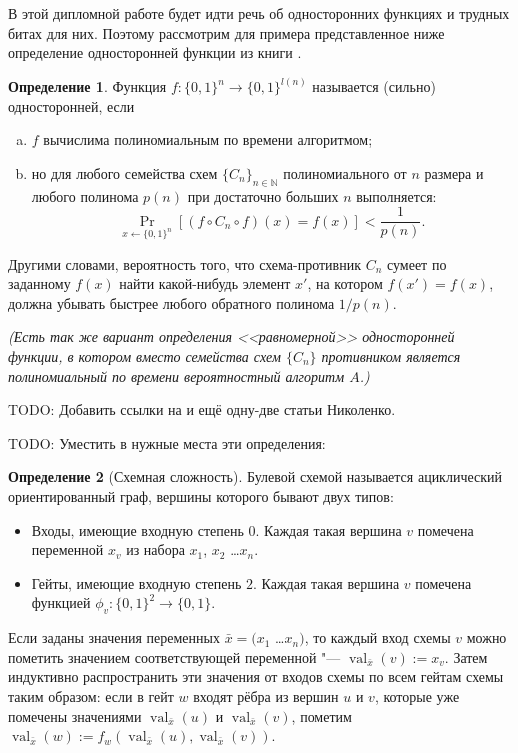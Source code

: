 \documentclass[oneside, a4paper]{article}
\theoremstyle{definition}
\newtheorem{definition}{Определение}
\theoremstyle{remark}
\DeclareMathOperator*{\val}{val}
\begin{document}
В этой дипломной работе будет идти речь об односторонних функциях и трудных
битах для них. Поэтому рассмотрим для примера представленное ниже определение
односторонней функции из книги \cite[гл. 2]{goldreich}.

\begin{definition}
Функция $f : \{0, 1\}^n \to \{0, 1\}^{l(n)}$ называется (сильно) односторонней,
если
\begin{enumerate}[(a)]
\item $f$ вычислима полиномиальным по времени алгоритмом;
\item но для любого семейства схем $\{ C_n \}_{n \in \mathbb N}$ полиномиального
от $n$ размера и любого полинома $p(n)$ при достаточно больших $n$ выполняется:
\[
\Pr_{x \gets \{0, 1\}^n}[(f \circ C_n \circ f)(x) = f(x)] < \frac 1 {p(n)}.
\]
\end{enumerate}

Другими словами, вероятность того, что схема-противник $C_n$ сумеет по заданному
$f(x)$ найти какой-нибудь элемент $x'$, на котором $f(x') = f(x)$, должна
убывать быстрее любого обратного полинома $1 / p(n)$.

\emph{(Есть так же вариант определения <<равномерной>> односторонней функции, в
котором вместо семейства схем $\{C_n\}$ противником является полиномиальный по
времени вероятностный алгоритм $A$.)}
\end{definition}


TODO: Добавить ссылки на \cite{hirsch_milanich_nikolenko} и ещё одну-две статьи
Николенко.

TODO: Уместить в нужные места эти определения:

\begin{definition}[Схемная сложность]
Булевой схемой называется ациклический ориентированный граф, вершины которого
бывают двух типов:
\begin{itemize}
\item Входы, имеющие входную степень $0$. Каждая такая вершина $v$ помечена
  переменной $x_v$ из набора $x_1$, $x_2$ \dots $x_n$.
\item Гейты, имеющие входную степень $2$. Каждая такая вершина $v$ помечена
  функцией $\phi_v : \{0, 1\}^2 \to \{0, 1\}$.
\end{itemize}

Если заданы значения переменных $\bar{x} = (x_1$ \dots $x_n)$, то каждый вход
схемы $v$ можно пометить значением соответствующей переменной "--- $\val_{\bar
x}(v) := x_v$. Затем индуктивно распространить эти значения от входов схемы по
всем гейтам схемы таким образом: если в гейт $w$ входят рёбра из вершин $u$ и
$v$, которые уже помечены значениями $\val_{\bar x}(u)$ и $\val_{\bar x}(v)$,
пометим $\val_{\bar x}(w) := f_w(\val_{\bar x}(u), \val_{\bar x}(v))$.

\end{definition}
\end{document}
